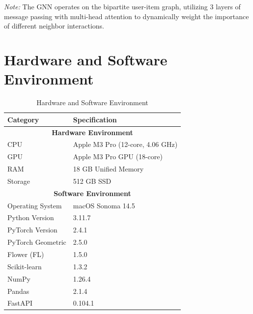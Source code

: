 \documentclass[12pt,a4paper]{report}
\begin{document}
{\begin{table}[htbp]
\centering
\small
\caption{GNN Architecture Specifications}
\label{tab:gnn_config}
\end{table}

\vspace{0.5em}
\textit{Note:} The GNN operates on the bipartite user-item graph, utilizing 3 layers of message passing with multi-head attention to dynamically weight the importance of different neighbor interactions.

\section{Hardware and Software Environment}

\begin{table}[htbp]
\centering
\small
\caption{Hardware and Software Environment}
\label{tab:hardware_software}
\begin{tabular}{ll}
\toprule
\textbf{Category} & \textbf{Specification} \\
\midrule
\multicolumn{2}{c}{\textbf{Hardware Environment}} \\
\midrule
CPU     & Apple M3 Pro (12-core, 4.06 GHz) \\
GPU     & Apple M3 Pro GPU (18-core) \\
RAM     & 18 GB Unified Memory \\
Storage & 512 GB SSD \\
\midrule
\multicolumn{2}{c}{\textbf{Software Environment}} \\
\midrule
Operating System   & macOS Sonoma 14.5 \\
Python Version     & 3.11.7 \\
PyTorch Version    & 2.4.1 \\
PyTorch Geometric  & 2.5.0 \\
Flower (FL)        & 1.5.0 \\
Scikit-learn       & 1.3.2 \\
NumPy              & 1.26.4 \\
Pandas             & 2.1.4 \\
FastAPI            & 0.104.1 \\
\bottomrule
\end{tabular}
\end{table}

}
\end{document}
